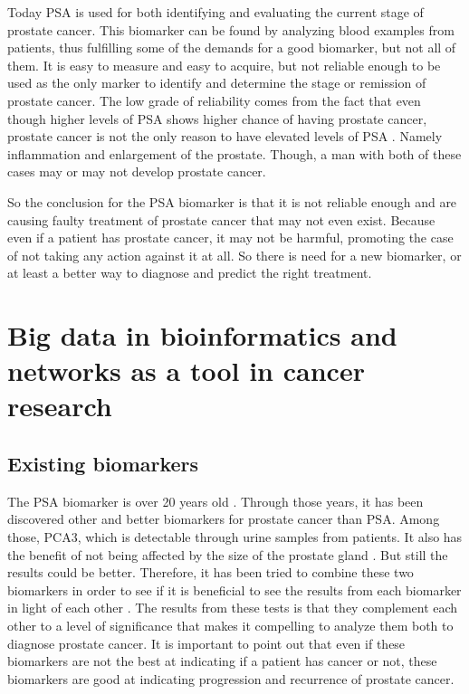 Today PSA is used for both identifying and evaluating the current stage of
prostate cancer. This biomarker can be found by analyzing blood examples from
patients, thus fulfilling some of the demands for a good biomarker, but not all
of them. It is easy to measure and easy to acquire, but not reliable enough to
be used as the only marker to identify and determine the stage or remission of
prostate cancer. The low grade of reliability comes from the fact that even
though higher levels of PSA shows higher chance of having prostate cancer,
prostate cancer is not the only reason to have elevated levels of PSA
\cite{cancerfacts}. Namely inflammation and enlargement of the prostate. Though,
a man with both of these cases may or may not develop prostate cancer.

So the conclusion for the PSA biomarker is that it is not reliable enough and
are causing faulty treatment of prostate cancer that may not even exist. Because
even if a patient has prostate cancer, it may not be harmful, promoting the case
of not taking any action against it at all. So there is need for a new
biomarker, or at least a better way to diagnose and predict the right treatment.

\chapter{Big data in bioinformatics and networks as a tool in cancer research}
\section{Existing biomarkers}
The PSA biomarker is over 20 years old \cite{psa-age}. Through those years, it
has been discovered other and better biomarkers for prostate cancer than PSA.
Among those, PCA3, which is detectable through urine samples from patients. It
also has the benefit of not being affected by the size of the prostate gland
\cite{pca3-size}. But still the results could be better. Therefore, it has been
tried to combine these two biomarkers in order to see if it is beneficial to see
the results from each biomarker in light of each other \cite{beyondpsa}. The
results from these tests is that they complement each other to a level of
significance that makes it compelling to analyze them both to diagnose prostate
cancer. It is important to point out that even if these biomarkers are not the
best at indicating if a patient has cancer or not, these biomarkers are good at
indicating progression and recurrence of prostate cancer.

